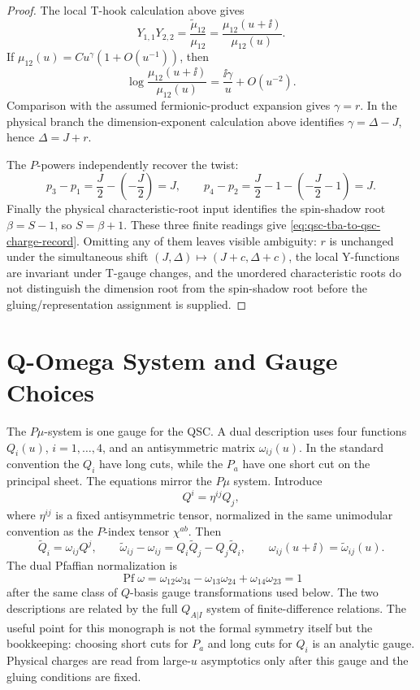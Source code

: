 \begin{proof}
The local T-hook calculation above gives
\[
  Y_{1,1}Y_{2,2}=\frac{\widetilde\mu_{12}}{\mu_{12}}
  =\frac{\mu_{12}(u+\ii)}{\mu_{12}(u)} .
\]
If \(\mu_{12}(u)=C u^\gamma(1+O(u^{-1}))\), then
\[
  \log\frac{\mu_{12}(u+\ii)}{\mu_{12}(u)}
  =
  \frac{\ii\gamma}{u}+O(u^{-2}).
\]
Comparison with the assumed fermionic-product expansion gives
\(\gamma=r\).  In the physical branch the dimension-exponent calculation above
identifies \(\gamma=\Delta-J\), hence \(\Delta=J+r\).

The \(P\)-powers independently recover the twist:
\[
  p_3-p_1=\frac J2-\left(-\frac J2\right)=J,\qquad
  p_4-p_2=\frac J2-1-\left(-\frac J2-1\right)=J.
\]
Finally the physical characteristic-root input identifies the spin-shadow root
\(\beta=S-1\), so \(S=\beta+1\).  These three finite readings give
\eqref{eq:qsc-tba-to-qsc-charge-record}.  Omitting any of them leaves visible
ambiguity: \(r\) is unchanged under the simultaneous shift
\((J,\Delta)\mapsto(J+c,\Delta+c)\), the local Y-functions are invariant under
T-gauge changes, and the unordered characteristic roots do not distinguish the
dimension root from the spin-shadow root before the gluing/representation
assignment is supplied.
\end{proof}

\section{Q-Omega System and Gauge Choices}

The \(P\mu\)-system is one gauge for the QSC.  A dual description uses four
functions \(Q_i(u)\), \(i=1,\ldots,4\), and an antisymmetric matrix
\(\omega_{ij}(u)\).  In the standard convention the \(Q_i\) have long cuts,
while the \(P_a\) have one short cut on the principal sheet.  The equations
mirror the \(P\mu\) system.  Introduce
\[
  Q^i=\eta^{ij}Q_j,
\]
where \(\eta^{ij}\) is a fixed antisymmetric tensor, normalized in the same
unimodular convention as the \(P\)-index tensor \(\chi^{ab}\).  Then
\[
  \widetilde Q_i=\omega_{ij}Q^j,\qquad
  \widetilde\omega_{ij}-\omega_{ij}
  =
  Q_i\widetilde Q_j-Q_j\widetilde Q_i,
  \qquad
  \omega_{ij}(u+\ii)=\widetilde\omega_{ij}(u).
\]
The dual Pfaffian normalization is
\[
  \operatorname{Pf}\omega
  =
  \omega_{12}\omega_{34}-\omega_{13}\omega_{24}
  +\omega_{14}\omega_{23}
  =
  1
\]
after the same class of \(Q\)-basis gauge transformations used below.
The two descriptions are related by the full \(Q_{A|I}\) system of
finite-difference relations.  The useful point for this monograph is not the
formal symmetry itself but the bookkeeping: choosing short cuts for \(P_a\)
and long cuts for \(Q_i\) is an analytic gauge.  Physical charges are read
from large-\(u\) asymptotics only after this gauge and the gluing conditions
are fixed.

